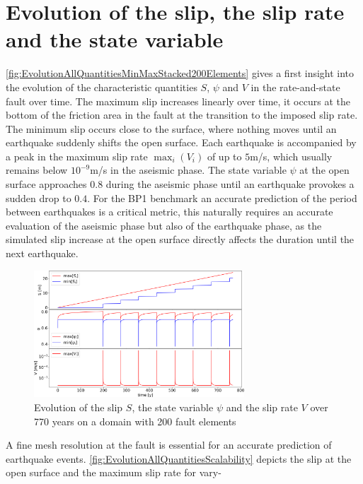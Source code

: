 \section{Evolution of the slip, the slip rate and the state variable}
\label{sec:2DSEAS__EvolutionOfQuantities}
\autoref{fig:EvolutionAllQuantitiesMinMaxStacked200Elements} gives a first insight into the evolution of the characteristic quantities $S$, $\psi$ and $V$ in the rate-and-state fault over time. The maximum slip increases linearly over time, it occurs at the bottom of the friction area in the fault at the transition to the imposed slip rate. The minimum slip occurs close to the surface, where nothing moves until an earthquake suddenly shifts the open surface. Each earthquake is accompanied by a peak in the maximum slip rate $\max_i(V_i)$ of up to $5$m/s, which usually remains below $10^{-9}$m/s in the aseismic phase. The state variable $\psi$ at the open surface approaches $0.8$ during the aseismic phase until an earthquake provokes a sudden drop to $0.4$. For the BP1 benchmark an accurate prediction of the period between earthquakes is a critical metric, this naturally requires an accurate evaluation of the aseismic phase but also of the earthquake phase, as the simulated slip increase at the open surface directly affects the duration until the next earthquake.

\begin{figure}[H]
	\centering
	\includegraphics[width=0.7\textwidth]{images/TANDEMtimeEvolution_MinMaxAllStacked_Size200_RKDP5_extendedODE.png}
	\caption{Evolution of the slip $S$, the state variable $\psi$ and the slip rate $V$ over 770 years on a domain with 200 fault elements}
	\label{fig:EvolutionAllQuantitiesMinMaxStacked200Elements}
\end{figure}

A fine mesh resolution at the fault is essential for an accurate prediction of earthquake events. \autoref{fig:EvolutionAllQuantitiesScalability} depicts the slip at the open surface and the maximum slip rate for vary-

